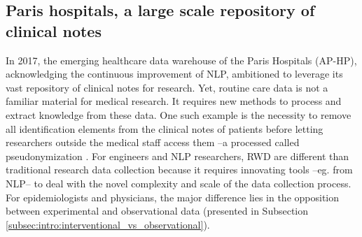 \documentclass[french,12pt,twoside,a4paper]{book}
\begin{document}

\subsection{Paris hospitals, a large scale repository of clinical notes}

In 2017, the emerging healthcare data warehouse of the Paris Hospitals (AP-HP),
acknowledging the continuous improvement of NLP, ambitioned to leverage its vast
repository of clinical notes for research.
Yet, routine care data is not a familiar material for medical research. It
requires new methods to process and extract knowledge from these data. One such
example is the necessity to remove all identification elements from the clinical
notes of patients before letting researchers outside the medical staff access
them --a processed called pseudonymization \citep{dernoncourt2017identification,
  paris2019desidentification}.%
For engineers and NLP researchers, RWD are different than traditional research
data collection because it requires innovating tools --eg. from NLP-- to deal
with the novel complexity and scale of the data collection process. For
epidemiologists and physicians, the major difference lies in the opposition
between experimental and observational data (presented in Subsection
\ref{subsec:intro:interventional_vs_observational}).
\end{document}
